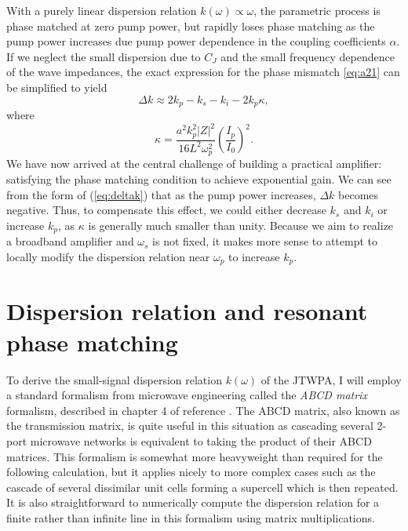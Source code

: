 With a purely linear dispersion relation $k(\omega) \propto \omega$, the parametric process is phase matched at zero pump power, but rapidly loses phase matching as the pump power increases due pump power dependence in the coupling coefficients $\alpha$.  If we neglect the small dispersion due to $C_J$ and the small frequency dependence of the wave impedances, the exact expression for the phase mismatch \eqref{eq:a21} can be simplified to yield
\begin{equation}
\Delta k \approx 2k_p-k_s-k_i - 2{k_p}\kappa,
\label{eq:deltak}
\end{equation}
where
\begin{equation}
\kappa  = \frac{a^2 k_p^2 \left| Z \right|^2}{16 L^2 \omega _p^2} \left( \frac{I_p}{I_0} \right)^2.
\label{eq:kappa}
\end{equation}
We have now arrived at the central challenge of building a practical amplifier: satisfying the phase matching condition to achieve exponential gain.  We can see from the form of (\ref{eq:deltak}) that as the pump power increases, $\Delta k$ becomes negative.  Thus, to compensate this effect, we could either decrease $k_s$ and $k_i$ or increase $k_p$, as $\kappa$ is generally much smaller than unity.  Because we aim to realize a broadband amplifier and $\omega_s$ is not fixed, it makes more sense to attempt to locally modify the dispersion relation near $\omega_p$ to increase $k_p$.




\section{Dispersion relation and resonant phase matching}

To derive the small-signal dispersion relation $k(\omega)$ of the JTWPA, I will employ a standard formalism from microwave engineering called the \textit{ABCD matrix} formalism, described in chapter 4 of reference \cite{pozar1997microwave}.  The ABCD matrix, also known as the transmission matrix, is quite useful in this situation as cascading several 2-port microwave networks is equivalent to taking the product of their ABCD matrices.  This formalism is somewhat more heavyweight than required for the following calculation, but it applies nicely to more complex cases such as the cascade of several dissimilar unit cells forming a supercell which is then repeated.  It is also straightforward to numerically compute the dispersion relation for a finite rather than infinite line in this formalism using matrix multiplications.

